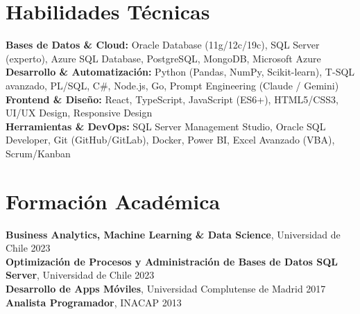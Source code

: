 \documentclass[11pt,letterpaper]{article}
\begin{document}
\section{Habilidades T\'{e}cnicas}
\textbf{Bases de Datos \& Cloud:} Oracle Database (11g/12c/19c), SQL Server (experto), Azure SQL Database, PostgreSQL, MongoDB, Microsoft Azure \\
\textbf{Desarrollo \& Automatización:} Python (Pandas, NumPy, Scikit-learn), T-SQL avanzado, PL/SQL, C\#, Node.js, Go, Prompt Engineering (Claude / Gemini) \\
\textbf{Frontend \& Diseño:} React, TypeScript, JavaScript (ES6+), HTML5/CSS3, UI/UX Design, Responsive Design \\
\textbf{Herramientas \& DevOps:} SQL Server Management Studio, Oracle SQL Developer, Git (GitHub/GitLab), Docker, Power BI, Excel Avanzado (VBA), Scrum/Kanban

\section{Formaci\'{o}n Acad\'{e}mica}
\textbf{Business Analytics, Machine Learning \& Data Science}, Universidad de Chile \hfill 2023 \\
\textbf{Optimización de Procesos y Administración de Bases de Datos SQL Server}, Universidad de Chile \hfill 2023 \\
\textbf{Desarrollo de Apps Móviles}, Universidad Complutense de Madrid \hfill 2017 \\
\textbf{Analista Programador}, INACAP \hfill 2013
\end{document}
